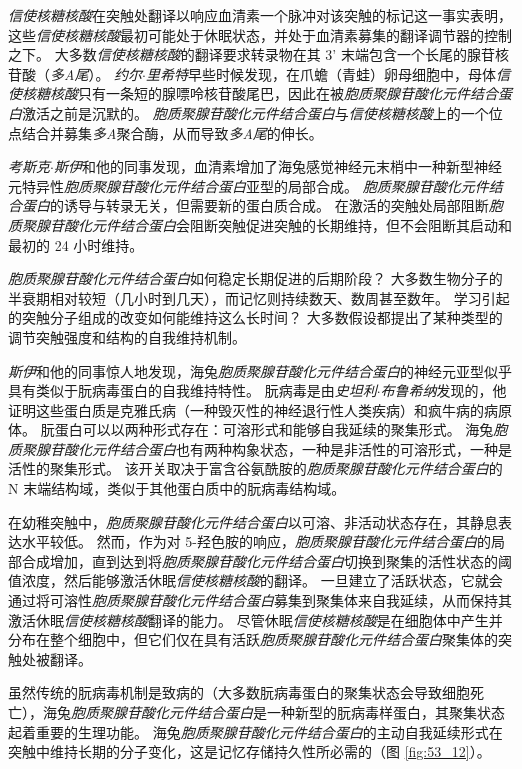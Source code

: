 \textit{信使核糖核酸}在突触处翻译以响应血清素一个脉冲对该突触的标记这一事实表明，这些\textit{信使核糖核酸}最初可能处于休眠状态，并处于血清素募集的翻译调节器的控制之下。
大多数\textit{信使核糖核酸}的翻译要求转录物在其 3' 末端包含一个长尾的腺苷核苷酸（\textit{多A尾}）。
\textit{约尔$\cdot$里希特}早些时候发现，在爪蟾（青蛙）卵母细胞中，母体\textit{信使核糖核酸}只有一条短的腺嘌呤核苷酸尾巴，因此在被\textit{胞质聚腺苷酸化元件结合蛋白}激活之前是沉默的。
\textit{胞质聚腺苷酸化元件结合蛋白}与\textit{信使核糖核酸}上的一个位点结合并募集\textit{多A}聚合酶，从而导致\textit{多A尾}的伸长。


\textit{考斯克$\cdot$斯伊}和他的同事发现，血清素增加了海兔感觉神经元末梢中一种新型神经元特异性\textit{胞质聚腺苷酸化元件结合蛋白}亚型的局部合成。
\textit{胞质聚腺苷酸化元件结合蛋白}的诱导与转录无关，但需要新的蛋白质合成。
在激活的突触处局部阻断\textit{胞质聚腺苷酸化元件结合蛋白}会阻断突触促进突触的长期维持，但不会阻断其启动和最初的 24 小时维持。


\textit{胞质聚腺苷酸化元件结合蛋白}如何稳定长期促进的后期阶段？
大多数生物分子的半衰期相对较短（几小时到几天），而记忆则持续数天、数周甚至数年。
学习引起的突触分子组成的改变如何能维持这么长时间？
大多数假设都提出了某种类型的调节突触强度和结构的自我维持机制。


\textit{斯伊}和他的同事惊人地发现，海兔\textit{胞质聚腺苷酸化元件结合蛋白}的神经元亚型似乎具有类似于朊病毒蛋白的自我维持特性。
朊病毒是由\textit{史坦利$\cdot$布鲁希纳}发现的，他证明这些蛋白质是克雅氏病（一种毁灭性的神经退行性人类疾病）和疯牛病的病原体。
朊蛋白可以以两种形式存在：可溶形式和能够自我延续的聚集形式。
海兔\textit{胞质聚腺苷酸化元件结合蛋白}也有两种构象状态，一种是非活性的可溶形式，一种是活性的聚集形式。
该开关取决于富含谷氨酰胺的\textit{胞质聚腺苷酸化元件结合蛋白}的 N 末端结构域，类似于其他蛋白质中的朊病毒结构域。


在幼稚突触中，\textit{胞质聚腺苷酸化元件结合蛋白}以可溶、非活动状态存在，其静息表达水平较低。
然而，作为对 5-羟色胺的响应，\textit{胞质聚腺苷酸化元件结合蛋白}的局部合成增加，直到达到将\textit{胞质聚腺苷酸化元件结合蛋白}切换到聚集的活性状态的阈值浓度，然后能够激活休眠\textit{信使核糖核酸}的翻译。
一旦建立了活跃状态，它就会通过将可溶性\textit{胞质聚腺苷酸化元件结合蛋白}募集到聚集体来自我延续，从而保持其激活休眠\textit{信使核糖核酸}翻译的能力。
尽管休眠\textit{信使核糖核酸}是在细胞体中产生并分布在整个细胞中，但它们仅在具有活跃\textit{胞质聚腺苷酸化元件结合蛋白}聚集体的突触处被翻译。


虽然传统的朊病毒机制是致病的（大多数朊病毒蛋白的聚集状态会导致细胞死亡），海兔\textit{胞质聚腺苷酸化元件结合蛋白}是一种新型的朊病毒样蛋白，其聚集状态起着重要的生理功能。
海兔\textit{胞质聚腺苷酸化元件结合蛋白}的主动自我延续形式在突触中维持长期的分子变化，这是记忆存储持久性所必需的（图 \ref{fig:53_12}）。


